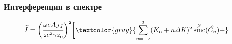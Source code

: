 \documentclass[14pt, hyperref = {colorlinks}]{beamer}
\DeclareMathOperator{\sinc}{sinc}
\begin{document}
\small
\begin{frame}
\frametitle{Интерференция в спектре}\label{t1}
\vspace{-5pt}
\begin{figure}[h]
	\begin{minipage}[h]{0.49\linewidth}
		\vspace{-10pt}
	\end{minipage}	
	\begin{minipage}[h]{0.49\linewidth}
		\vspace{-10pt}
	\end{minipage}
\end{figure}
\vspace{-20pt}
\begin{figure}[h]
	$\mathnormal{{\widetilde{I}} =
		\bigg(\cfrac{\omega eA_{JJ}}{2c^2 \gamma z_0}\bigg)^2\bigg[
		\textcolor{gray}{\displaystyle\sum\limits_{n =-2}^{2}(K_0 + n\Delta K)^2\sinc^2(\hat{C_n}) + }}$\\
	

\end{figure}
\end{frame}
\end{document}

